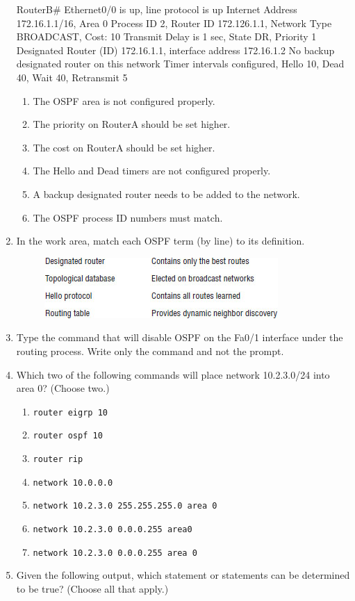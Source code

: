 \begin{enumerate}
\begin{cli}
RouterB#
Ethernet0/0 is up, line protocol is up
  Internet Address 172.16.1.1/16, Area 0
  Process ID 2, Router ID 172.126.1.1, Network Type BROADCAST, Cost: 10
  Transmit Delay is 1 sec, State DR, Priority 1
  Designated Router (ID) 172.16.1.1, interface address 172.16.1.2
  No backup designated router on this network
  Timer intervals configured, Hello 10, Dead 40, Wait 40, Retransmit 5
\end{cli}

  \begin{enumerate}
  \def\labelenumii{\Alph{enumii}.}
    \item
    The OSPF area is not configured properly.
  \item
    The priority on RouterA should be set higher.
  \item
    The cost on RouterA should be set higher.
  \item
    The Hello and Dead timers are not configured properly.
  \item
    A backup designated router needs to be added to the network.
  \item
    The OSPF process ID numbers must match.
  \end{enumerate}
\item
  In the work area, match each OSPF term (by line) to its definition.

  \begin{figure}
  \centering
      \includegraphics{images/c18f010.jpg}
  \caption{}
  \end{figure}
\item
  Type the command that will disable OSPF on the Fa0/1 interface under
  the routing process. Write only the command and not the prompt.
\item
  \protect\hypertarget{c18.xhtmlux5cux23Page_780}{}{}Which two of the
  following commands will place network 10.2.3.0/24 into area 0? (Choose
  two.)

  \begin{enumerate}
  \def\labelenumii{\Alph{enumii}.}
    \item
    \texttt{router\ eigrp\ 10}
  \item
    \texttt{router\ ospf\ 10}
  \item
    \texttt{router\ rip}
  \item
    \texttt{network\ 10.0.0.0}
  \item
    \texttt{network\ 10.2.3.0\ 255.255.255.0\ area\ 0}
  \item
    \texttt{network\ 10.2.3.0\ 0.0.0.255\ area0}
  \item
    \texttt{network\ 10.2.3.0\ 0.0.0.255\ area\ 0}
  \end{enumerate}
\item
  Given the following output, which statement or statements can be
  determined to be true? (Choose all that apply.)


\end{enumerate}
